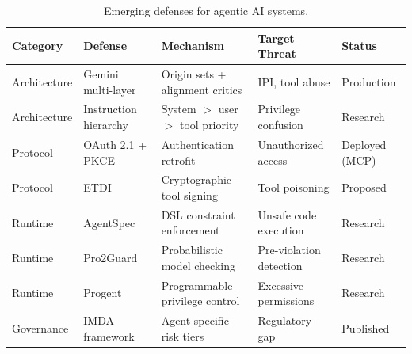 
\begin{table}[htbp]
\centering
\caption{Emerging defenses for agentic AI systems.}
\label{tab:agentic-defense}

\fontsize{7}{9}\selectfont
\setlength{\tabcolsep}{5pt}
\renewcommand{\arraystretch}{1.3}

\begin{tabular}{l l l l l}
\toprule
\textbf{Category} & \textbf{Defense} & \textbf{Mechanism} & \textbf{Target Threat} & \textbf{Status} \\
\midrule

\rowcolor{rowgray}
Architecture
  & Gemini multi-layer~\cite{google2025geminidefense}
  & Origin sets + alignment critics
  & IPI, tool abuse
  & Production \\

Architecture
  & Instruction hierarchy~\cite{wallace2024hierarchy}
  & System $>$ user $>$ tool priority
  & Privilege confusion
  & Research \\

\rowcolor{rowgray}
Protocol
  & OAuth 2.1 + PKCE~\cite{mcpspec2025}
  & Authentication retrofit
  & Unauthorized access
  & Deployed (MCP) \\

Protocol
  & ETDI~\cite{bhatt2025etdi}
  & Cryptographic tool signing
  & Tool poisoning
  & Proposed \\

\rowcolor{rowgray}
Runtime
  & AgentSpec~\cite{wang2025agentspec}
  & DSL constraint enforcement
  & Unsafe code execution
  & Research \\

Runtime
  & Pro2Guard~\cite{pro2guard2025}
  & Probabilistic model checking
  & Pre-violation detection
  & Research \\

\rowcolor{rowgray}
Runtime
  & Progent~\cite{shi2025progent}
  & Programmable privilege control
  & Excessive permissions
  & Research \\

Governance
  & IMDA framework~\cite{imda2026agentic}
  & Agent-specific risk tiers
  & Regulatory gap
  & Published \\

\bottomrule
\end{tabular}
\end{table}
